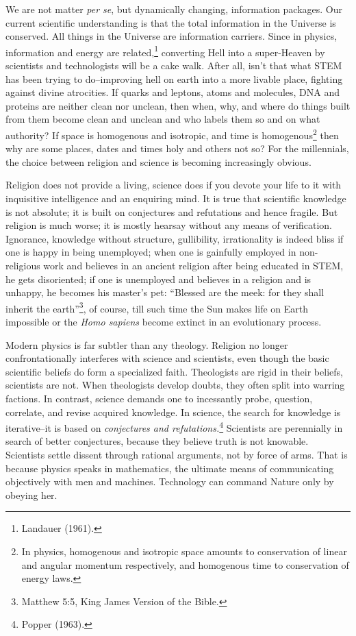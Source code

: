 \begin{multicols}{2}
We are not matter \textit{per se}, but dynamically changing, information packages. Our current scientific understanding is that the total information in the Universe is conserved. All things in the Universe are information carriers. Since in physics, information and energy are related,\footnote{Landauer (1961).} converting Hell into a super-Heaven by scientists and technologists will be a cake walk. After all, isn't that what STEM has been trying to do--improving hell on earth into a more livable place, fighting against divine atrocities. If quarks and leptons, atoms and molecules, DNA and proteins are neither clean nor unclean, then when, why, and where do things built from them become clean and unclean and who labels them so and on what authority? If space is homogenous and isotropic, and time is homogenous\footnote{In physics, homogenous and isotropic space amounts to conservation of linear and angular momentum respectively, and homogenous time to conservation of energy laws.}  then why are some places, dates and times holy and others not so? For the millennials, the choice between religion and science is becoming increasingly obvious.

Religion does not provide a living, science does if you devote your life to it with inquisitive intelligence and an enquiring mind. It is true that scientific knowledge is not absolute; it is built on conjectures and refutations and hence fragile. But religion is much worse; it is mostly hearsay without any means of verification. Ignorance, knowledge without structure, gullibility, irrationality is indeed bliss if one is happy in being unemployed; when one is gainfully employed in non-religious work and believes in an ancient religion after being educated in STEM, he gets disoriented; if one is unemployed and believes in a religion and is unhappy, he becomes his master's pet: “Blessed are the meek: for they shall inherit the earth”\footnote{Matthew 5:5, King James Version of the Bible.}, of course, till such time the Sun makes life on Earth impossible or the \textit{Homo sapiens} become extinct in an evolutionary process.

Modern physics is far subtler than any theology. Religion no longer confrontationally interferes with science and scientists, even though the basic scientific beliefs do form a specialized faith. Theologists are rigid in their beliefs, scientists are not. When theologists develop doubts, they often split into warring factions. In contrast, science demands one to incessantly probe, question, correlate, and revise acquired knowledge. In science, the search for knowledge is iterative--it is based on \textit{conjectures and refutations.}\footnote{Popper (1963).} Scientists are perennially in search of better conjectures, because they believe truth is not knowable. Scientists settle dissent through rational arguments, not by force of arms. That is because physics speaks in mathematics, the ultimate means of communicating objectively with men and machines. Technology can command Nature only by obeying her.


\end{multicols}
